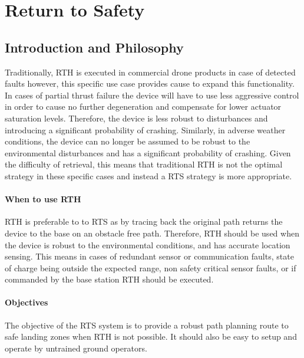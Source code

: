 \newpage
{}
\section{Return to Safety} \label{Return to Safety}

\subsection{Introduction and Philosophy}
Traditionally, \gls{RTH} is executed in commercial drone products in case of detected faults however, this specific use case provides cause to expand this functionality. In cases of partial thrust failure the device will have to use less aggressive control in order to cause no further degeneration and compensate for lower actuator saturation levels. Therefore, the device is less robust to disturbances and introducing a significant probability of crashing. Similarly, in adverse weather conditions, the device can no longer be assumed to be robust to the environmental disturbances and has a significant probability of crashing. Given the difficulty of retrieval, this means that traditional \gls{RTH} is not the optimal strategy in these specific cases and instead a \gls{RTS} strategy is more appropriate.
\paragraph{When to use \gls{RTH}}
\gls{RTH} is preferable to to \gls{RTS} as by tracing back the original path returns the device to the base on an obstacle free path. Therefore, \gls{RTH} should be used when the device is robust to the environmental conditions, and  has accurate location sensing. This means in cases of redundant sensor or communication faults, state of charge being outside the expected range, non safety critical sensor faults, or if commanded by the base station \gls{RTH} should be executed.
\paragraph{Objectives}
The objective of the \gls{RTS} system is to provide a robust path planning route to safe landing zones when \gls{RTH} is not possible. It should also be easy to setup and operate by untrained ground operators.



